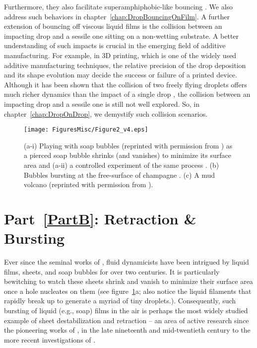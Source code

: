 Furthermore, they also facilitate superamphiphobic-like bouncing \citep{kolinski2014drops}. We also address such behaviors in chapter~\ref{chap:DropBouncingOnFilm}. A further extension of bouncing off viscous liquid films is the collision between an impacting drop and a sessile one sitting on a non-wetting substrate. A better understanding of such impacts is crucial in the emerging field of additive manufacturing. For example, in 3D printing, which is one of the widely used additive manufacturing techniques, the relative precision of the drop deposition and its shape evolution may decide the success or failure of a printed device. Although it has been shown that the collision of two freely flying droplets offers much richer dynamics than the impact of a single drop \citep{jiang1992, qian1997}, the collision between an impacting drop and a sessile one is still not well explored. So, in chapter~\ref{chap:DropOnDrop}, we demystify such collision scenarios.

\begin{figure}
	\centering
	\texttt{[image: FiguresMisc/Figure2\_v4.eps]}
	\caption{(a-i) Playing with soap bubbles (reprinted with permission from \citet{guyon2021hidden}) as a pierced soap bubble shrinks (and vanishes) to minimize its surface area and (a-ii) a controlled experiment of the same process \citep{lhuissier2012bursting}. (b) Bubbles bursting at the free-surface of champagne \citep{ghabache2016evaporation}. (c) A mud volcano (reprinted with permission from \citet{balmforth2014yielding}).}
	\label{Ch0::Fig2}
\end{figure}

\section*{Part~\ref{PartB}: Retraction \& Bursting}
Ever since the seminal works of \citet{savart1833oppositejets, savart1833waterbells, savart1833hydraulicjump}, fluid dynamicists have been intrigued by liquid films, sheets, and soap bubbles for over two centuries. It is particularly bewitching to watch these sheets shrink and vanish to minimize their surface area once a hole nucleates on them (see figure~\ref{Ch0::Fig2}a; also notice the liquid filaments that rapidly break up to generate a myriad of tiny droplets.). Consequently, such bursting of liquid (e.g., soap) films in the air is perhaps the most widely studied example of sheet destabilization and retraction -- an area of active research since the pioneering works of \citet{dupre1867theorie, dupre1869theorie, rayleigh-1891-nature}, \citet{taylor-1959-procrsoclonda, culick-1960-japplphys, mcentee-1969-jphyschem} in the late nineteenth and mid-twentieth century to the more recent investigations of \citet{bremond-2005-jfm, muller-2007-prl, lhuissier2012bursting, munro-2015-jfm, deka2020revisiting}.

